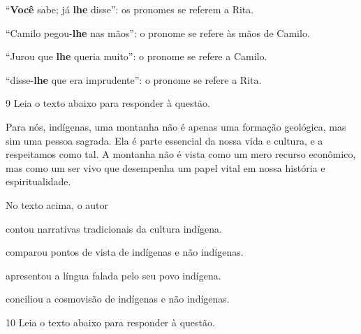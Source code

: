 \begin{escolha}

  \item ``\textbf{Você} sabe; já \textbf{lhe} disse'': os pronomes se referem a Rita.
  
  \item ``Camilo pegou-\textbf{lhe} nas mãos'': o pronome se refere às mãos de Camilo.
  
  \item ``Jurou que \textbf{lhe} queria muito'': o pronome se refere a Camilo.
  
  \item ``disse-\textbf{lhe} que era imprudente'': o pronome se refere a Rita.

\end{escolha}

\num{9} Leia o texto abaixo para responder à questão.

\begin{myquote}

Para nós, indígenas, uma montanha não é apenas uma formação geológica, mas sim
uma pessoa sagrada. Ela é parte essencial da nossa vida e cultura, e a
respeitamos como tal. A montanha não é vista como um mero recurso econômico,
mas como um ser vivo que desempenha um papel vital em nossa história e
espiritualidade. 


\end{myquote}

No texto acima, o autor

\begin{escolha}

  \item contou narrativas tradicionais da cultura indígena.

  \item comparou pontos de vista de indígenas e não indígenas.

  \item apresentou a língua falada pelo seu povo indígena.

  \item conciliou a cosmovisão de indígenas e não indígenas.

\end{escolha}

\num{10} Leia o texto abaixo para responder à questão.

